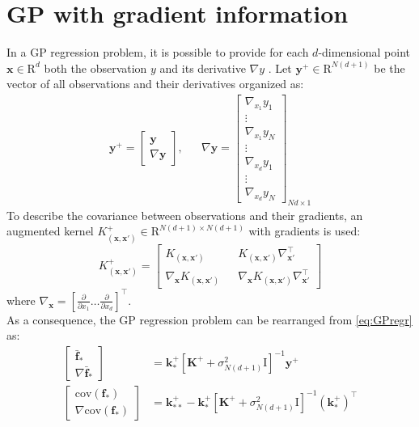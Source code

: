 \documentclass[10pt,a4paper,twocolumn]{article}
\newcommand{\trsp}{{\scriptscriptstyle\top}}
\newcommand{\cov}{\mathrm{cov}}
\begin{document}
\section{GP with gradient information}
In a GP regression problem, it is possible to provide for each $d$-dimensional point $\mathbf{x} \in \mathrm{R}^d$ both the observation $y$ and its derivative $\nabla y$ \cite{wu_exploiting_2018}. Let $\mathbf{y}^+ \in \mathrm{R}^{N(d+1)}$ be the vector of all observations and their derivatives organized as:
\begin{align}
	\mathbf{y}^+ = 
	\begin{bmatrix}
		\mathbf{y} \\
		\nabla \mathbf{y} 
	\end{bmatrix},
	&&
	\nabla \mathbf{y} =
	\begin{bmatrix}
		\nabla_{x_1} y_1 \\
		\vdots \\
		\nabla_{x_1} y_N \\
		\vdots \\
		\nabla_{x_d} y_1 \\
		\vdots \\
		\nabla_{x_d} y_N
	\end{bmatrix}_{Nd \times 1}
\end{align}
To describe the covariance between observations and their gradients, an augmented kernel $K^+_{(\mathbf{x}, \mathbf{x'})} \in \mathrm{R}^{N(d+1) \times N(d+1)}$ with gradients is used:
\begin{equation}
	K^+_{(\mathbf{x}, \mathbf{x'})} =	
	\begin{bmatrix}
		K_{(\mathbf{x}, \mathbf{x'})} && K_{(\mathbf{x}, \mathbf{x'})} \nabla_{\mathbf{x}'} ^\trsp \\
		\nabla_{\mathbf{x}} K_{(\mathbf{x}, \mathbf{x'})} && \nabla_{\mathbf{x}} K_{(\mathbf{x}, \mathbf{x'})} \nabla_{\mathbf{x}'} ^\trsp
	\end{bmatrix}
\end{equation}
where $\nabla_{\mathbf{x}} = \left[ \frac{\partial}{\partial x_1} \ldots \frac{\partial}{\partial x_d} \right]^\trsp$. \\
As a consequence, the GP regression problem can be rearranged from \autoref{eq:GPregr} as:
\begin{equation}\label{eq:GPgrad}
	\begin{aligned}
		\begin{bmatrix}
			\mathbf{\bar{f}_*} \\
			\nabla \mathbf{\bar{f}_*}
		\end{bmatrix}
		&= \mathbf{k}_*^+[\mathbf{K^+} + \sigma_{N(d+1)}^2 \mathrm{I}]^{-1}\mathbf{y^+}\\   
		\begin{bmatrix}
			\cov(\mathbf{f}_*) \\
			\nabla \cov(\mathbf{f}_*)
		\end{bmatrix} 
		&= \mathbf{k}_{**}^+ - \mathbf{k}_*^+[\mathbf{K}^+ + \sigma_{N(d+1)}^2 \mathrm{I}]^{-1} \left( \mathbf{k}_*^+ \right) ^\trsp 
	\end{aligned}
\end{equation}
\end{document}
